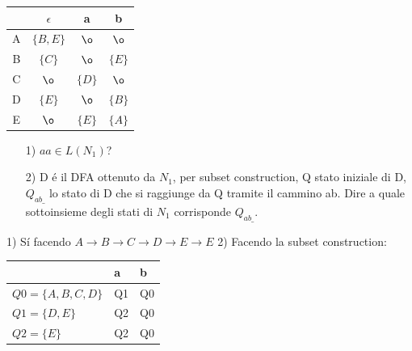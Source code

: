 \begin{center}
    \begin{tabular}{|c|c|c|c|}
        \hline
            &   $\epsilon$      &   a           &   b           \\
        \hline
            A    &   $\{B, E\}$ &   $\o$        &  $\o$         \\
        \hline
            B    &   $\{ C \}$  &   $\o$        &  $\{ E \}$    \\
        \hline
            C    &   $\o$       &   $\{ D \}$   &  $\o$         \\
        \hline
            D    &   $\{ E \}$  &   $\o$        &  $\{ B \}$    \\
        \hline
            E    &   $\o$       &    $\{ E \}$  &  $\{ A \}$    \\
        \hline
    \end{tabular}
\end{center} 

\begin{itemize}
    \item[1)] $aa \in L(N_1)$?\\
    \item[2)] D \'e il DFA ottenuto da $N_1$, per subset construction, Q stato iniziale di D, $Q_{ab\_}$ lo stato di D che si 
    raggiunge da Q tramite il cammino ab. Dire a quale sottoinsieme degli stati di $N_1$ corrisponde $Q_{ab\_}$.\\    
\end{itemize}

1) S\'i facendo $A \rightarrow B \rightarrow C \rightarrow D \rightarrow E \rightarrow E $
2) Facendo la subset construction:

\begin{center}
    \begin{tabular}{|l|l|l|}
        \hline
                                &   a   &  b    \\
        \hline
            $Q0 = \{A,B,C,D\}$  &   Q1  &  Q0   \\
        \hline
            $Q1 = \{D,E\}$      &   Q2  &  Q0   \\
        \hline
           $Q2 = \{E\}$         &   Q2  &  Q0   \\
        \hline
    \end{tabular}
\end{center} 

